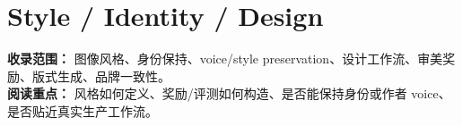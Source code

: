 
\section*{Style / Identity / Design}
{}

\begin{conceptbox}
\textbf{收录范围：} 图像风格、身份保持、voice/style preservation、设计工作流、审美奖励、版式生成、品牌一致性。\\
\textbf{阅读重点：} 风格如何定义、奖励/评测如何构造、是否能保持身份或作者 voice、是否贴近真实生产工作流。
\end{conceptbox}

